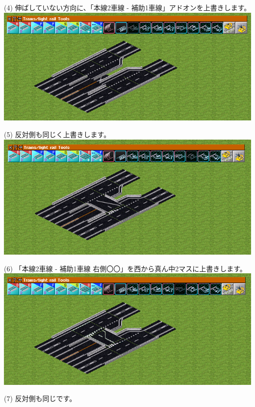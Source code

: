 \documentclass{jarticle}
\begin{document}
  (4)
  伸ばしていない方向に、「本線2車線 - 補助1車線」アドオンを上書きします。
  \\


  \includegraphics[width = 135mm]{picture/20210214-road-1-6.png}

  (5)
  反対側も同じく上書きします。
  \\


  \includegraphics[width = 135mm]{picture/20210214-road-1-7.png}

  (6)
  「本線2車線 - 補助1車線 右側〇〇」を西から真ん中2マスに上書きします。
  \\


  \includegraphics[width = 135mm]{picture/20210214-road-1-8.png}

  (7)
  反対側も同じです。
  \\
\end{document}
